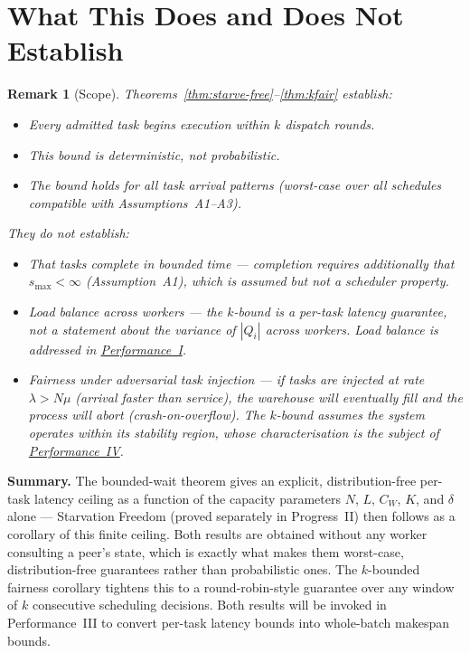 \documentclass[11pt,a4paper]{article}
\newtheorem{remark}{Remark}[section]
\begin{document}
\section{What This Does and Does Not Establish}

\begin{remark}[Scope]
Theorems~\ref{thm:starve-free}--\ref{thm:kfair} establish:
\begin{itemize}
  \item Every admitted task \emph{begins} execution within $k$
        dispatch rounds.
  \item This bound is \emph{deterministic}, not probabilistic.
  \item The bound holds for all task arrival patterns (worst-case
        over all schedules compatible with Assumptions~A1--A3).
\end{itemize}
They do \emph{not} establish:
\begin{itemize}
  \item That tasks complete in bounded time --- completion requires
        additionally that $s_{\max} < \infty$ (Assumption~A1),
        which is assumed but not a scheduler property.
  \item Load balance across workers --- the $k$-bound is a per-task
        latency guarantee, not a statement about the variance of
        $|Q_i|$ across workers.  Load balance is addressed in
        \hyperref[chap:load_balance]{Performance~I}.
  \item Fairness under adversarial task injection --- if tasks are
        injected at rate $\lambda > N\mu$ (arrival faster than
        service), the warehouse will eventually fill and the
        process will abort (crash-on-overflow).  The $k$-bound
        assumes the system operates within its stability region,
        whose characterisation is the subject of
        \hyperref[chap:stability]{Performance~IV}.
\end{itemize}
\end{remark}


\bigskip
\noindent\textbf{Summary.}
The bounded-wait theorem gives an explicit, distribution-free per-task
latency ceiling as a function of the capacity parameters $N$, $L$,
$C_W$, $K$, and $\delta$ alone --- Starvation Freedom (proved separately
in Progress~II) then follows as a corollary of this finite ceiling. Both
results are obtained without any worker consulting a peer's state, which
is exactly what makes them worst-case, distribution-free guarantees
rather than probabilistic ones.
The $k$-bounded fairness corollary tightens this to a round-robin-style
guarantee over any window of $k$ consecutive scheduling decisions.
Both results will be invoked in Performance~III to convert per-task
latency bounds into whole-batch makespan bounds.
\end{document}
